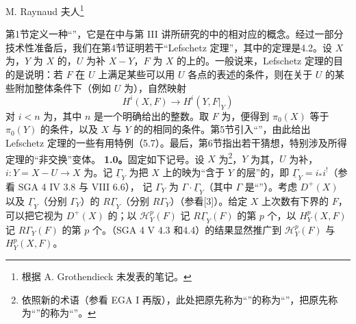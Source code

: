 \begin{center}M. Raynaud 夫人\footnote{根据 A. Grothendieck 未发表的笔记。}\end{center}
第1节定义一种“”，它是在中与第 III 讲所研究的中的相对应的概念。经过一部分技术性准备后，我们在第4节证明若干“Lefschetz 定理”，其中的定理是4.2。设 $X$ 为，$Y$ 为 $X$ 的，$U$ 为补 $X-Y$，$F$ 为 $X$ 的上的。一般说来，Lefschetz 定理的目的是说明：若 $F$ 在 $U$ 上满足某些可以用 $U$ 各点的表述的条件，则在关于 $U$ 的某些附加整体条件下（例如 $U$ 为），自然映射
\[H^i(X,F)\longrightarrow H^i(Y,F|_Y)\]
对 $i<n$ 为，其中 $n$ 是一个明确给出的整数。取 $F$ 为，便得到 $\pi_0(X)$ 等于 $\pi_0(Y)$ 的条件，以及 $X$ 与 $Y$ 的的相同的条件。第5节引入“”，由此给出 Lefschetz 定理的一些有用特例（5.7）。最后，第6节指出若干猜想，特别涉及所得定理的“非交换”变体。
\textbf{1.0。}固定如下记号。设 $X$ 为\footnote{依照新的术语（参看 EGA I 再版），此处把原先称为“”的称为“”，把原先称为“”的称为“”。}，$Y$ 为其，$U$ 为补，$i:Y=X-U\to X$ 为。记 $\underline\Gamma_Y$ 为把 $X$ 上的映为“含于 $Y$ 的层”的，即 $\underline\Gamma_Y=i_*i^!$（参看 SGA 4 IV 3.8 与 VIII 6.6），
记 $\Gamma_Y$ 为 $\Gamma\cdot\underline\Gamma_Y$（其中 $\Gamma$ 是“”）。考虑 $D^+(X)$ 以及 $\underline\Gamma_Y$（分别 $\Gamma_Y$）的 $R\underline\Gamma_Y$（分别 $R\Gamma_Y$）（参看[3]）。给定 $X$ 上次数有下界的 $F$，可以把它视为 $D^+(X)$ 的；以 $\mathcal H_Y^p(F)$ 记 $R\underline\Gamma_Y(F)$ 的第 $p$ 个，以 $H_Y^p(X,F)$ 记 $R\Gamma_Y(F)$ 的第 $p$ 个。（SGA 4 V 4.3 和4.4）的结果显然推广到 $\mathcal H_Y^p(F)$ 与 $H_Y^p(X,F)$。
